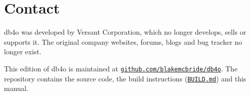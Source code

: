 
\chapter{Contact}
\label{tut:contact}

db4o was developed by Versant Corporation, which no longer develops, sells or supports it. The original company websites, forums, blogs and bug tracker no longer exist.

This edition of db4o is maintained at \href{https://github.com/blakemcbride/db4o}{\nolinkurl{github.com/blakemcbride/db4o}}. The repository contains the source code, the build instructions (\href{https://github.com/blakemcbride/db4o/blob/master/BUILD.md}{\nolinkurl{BUILD.md}}) and this manual.
